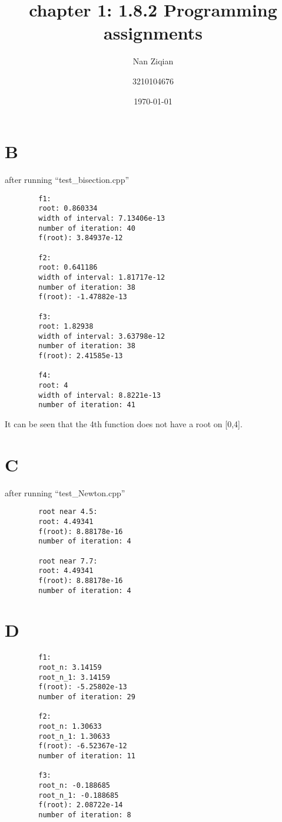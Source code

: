 \documentclass{article}
\title{chapter 1: 1.8.2 Programming assignments}
\author{Nan Ziqian
    \and 3210104676}
\date{\today}
\begin{document}
\maketitle
\section{B}

    after running ``test\_bisection.cpp''

    \begin{verbatim}
        f1:
        root: 0.860334
        width of interval: 7.13406e-13
        number of iteration: 40
        f(root): 3.84937e-12

        f2:
        root: 0.641186
        width of interval: 1.81717e-12
        number of iteration: 38
        f(root): -1.47882e-13

        f3:
        root: 1.82938
        width of interval: 3.63798e-12
        number of iteration: 38
        f(root): 2.41585e-13
        
        f4:
        root: 4
        width of interval: 8.8221e-13
        number of iteration: 41
    \end{verbatim}

    It can be seen that the 4th function does not have a root on [0,4].

\section{C}

    after running ``test\_Newton.cpp''

    \begin{verbatim}
        root near 4.5: 
        root: 4.49341
        f(root): 8.88178e-16
        number of iteration: 4

        root near 7.7:
        root: 4.49341
        f(root): 8.88178e-16
        number of iteration: 4
    \end{verbatim}

\section{D}
    \begin{verbatim}
        f1:
        root_n: 3.14159
        root_n_1: 3.14159
        f(root): -5.25802e-13
        number of iteration: 29

        f2:
        root_n: 1.30633
        root_n_1: 1.30633
        f(root): -6.52367e-12
        number of iteration: 11

        f3:
        root_n: -0.188685
        root_n_1: -0.188685
        f(root): 2.08722e-14
        number of iteration: 8
    \end{verbatim}
\end{document}
